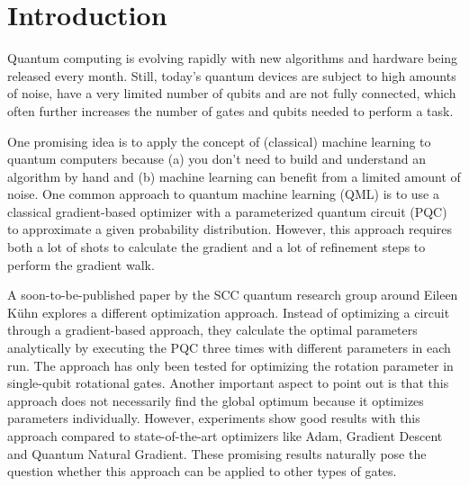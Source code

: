 \chapter{Introduction}
\label{chap:intro}


Quantum computing is evolving rapidly with new algorithms and hardware being
released every month. %
Still, today's quantum devices are subject to high amounts of noise, have a very
limited number of qubits and are not fully connected, which often further
increases the number of gates and qubits needed to perform a task.

One promising idea is to apply the concept of (classical) machine learning to
quantum computers because (a) you don't need to build and understand an
algorithm by hand and (b) machine learning can benefit from a limited amount of
noise.
One common approach to quantum machine learning (QML) is to use a classical
gradient-based optimizer with a parameterized quantum circuit (PQC) to
approximate a given probability distribution.
However, this approach requires both a lot of shots to calculate the gradient
and a lot of refinement steps to perform the gradient walk.

A soon-to-be-published paper by the SCC quantum research group around
Eileen Kühn explores a different optimization approach.
Instead of optimizing a circuit through a gradient-based approach, they
calculate the optimal parameters analytically by executing the PQC three times
with different parameters in each run.
The approach has only been tested for optimizing the rotation parameter in
single-qubit rotational gates.
Another important aspect to point out is that this approach does not necessarily
find the global optimum because it optimizes parameters individually.
However, experiments show good results with this approach compared to
state-of-the-art optimizers like Adam, Gradient Descent and Quantum Natural
Gradient.
These promising results naturally pose the question whether this approach can be
applied to other types of gates.

